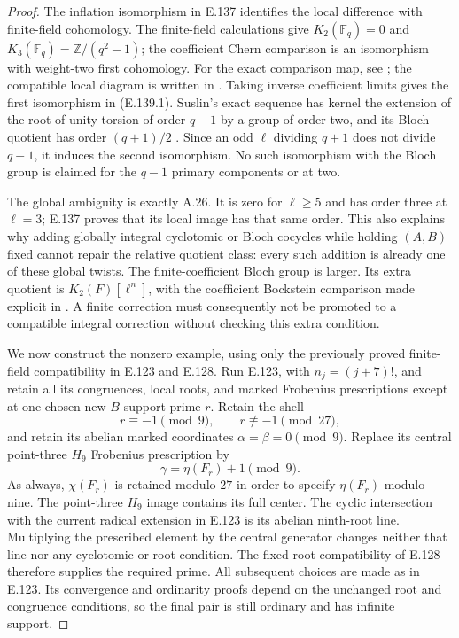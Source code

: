 \begin{proof}
The inflation isomorphism in E.137 identifies the local difference
with finite-field cohomology. The finite-field calculations give
$K_2(\mathbb F_q)=0$ and
$K_3(\mathbb F_q)=\mathbb Z/(q^2-1)$; the coefficient Chern
comparison is an isomorphism with weight-two first cohomology.
For the exact comparison map, see
\citet[Theorem~2.10, author p.~4]{AuditHutchinson2024};
the compatible local diagram is written in
\citet[Lemma~4.1, pp.~403--404]{AuditCGZ2023}.
Taking inverse coefficient limits gives the first isomorphism
in (E.139.1). Suslin's exact sequence has kernel the extension
of the root-of-unity torsion of order $q-1$ by a group of order
two, and its Bloch quotient has order $(q+1)/2$
\citep[VI.5.1.1--5.2]{CohWeibelKbook}.
Since an odd $\ell$ dividing $q+1$ does not divide $q-1$,
it induces the second isomorphism. No such isomorphism with the
Bloch group is claimed for the $q-1$ primary components or at two.

The global ambiguity is exactly A.26. It is zero for
$\ell\ge5$ and has order three at $\ell=3$; E.137 proves
that its local image has that same order. This also explains
why adding globally integral cyclotomic or Bloch cocycles while
holding $(A,B)$ fixed cannot repair the relative quotient class:
every such addition is already one of these global twists.
The finite-coefficient Bloch group is larger. Its extra quotient
is $K_2(F)[\ell^n]$, with the coefficient Bockstein comparison
made explicit in \citet[Theorem~1.7, p.~387, and \S6,
pp.~414--416]{AuditCGZ2023}. A finite correction must consequently
not be promoted to a compatible integral correction without
checking this extra condition.

We now construct the nonzero example, using only the previously
proved finite-field compatibility in E.123 and E.128. Run E.123,
with $n_j=(j+7)!$, and retain all its congruences, local roots,
and marked Frobenius prescriptions except at one chosen new
$B$-support prime $r$. Retain the shell
\[
 r\equiv-1\pmod9,\qquad r\not\equiv-1\pmod{27},
\]
and retain its abelian marked coordinates
$\alpha=\beta=0\pmod9$. Replace its central point-three
$H_9$ Frobenius prescription by
\[
                 \gamma=\eta(F_r)+1\pmod9.
 \tag{E.139.2}
\]
As always, $\chi(F_r)$ is retained modulo $27$ in order to
specify $\eta(F_r)$ modulo nine.
The point-three $H_9$ image contains its full center. The cyclic
intersection with the current radical extension in E.123 is
its abelian ninth-root line. Multiplying the prescribed element
by the central generator changes neither that line nor any
cyclotomic or root condition. The fixed-root compatibility of
E.128 therefore supplies the required prime. All subsequent
choices are made as in E.123. Its convergence and ordinarity
proofs depend on the unchanged root and congruence conditions,
so the final pair is still ordinary and has infinite support.


\end{proof}
